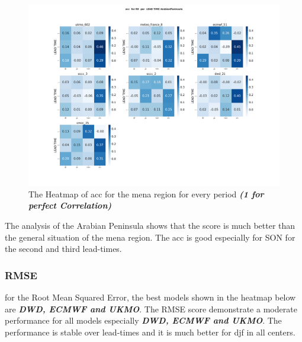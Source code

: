 \begin{figure}[H]
	\centering
	\includegraphics[scale=0.25]{plots/det/acc/acc_RR_ArabianPeninsula.png}
	\caption{The Heatmap of acc for the mena region for every period \textbf{\textit{(1 for perfect Correlation)} }}
\end{figure}

The analysis of the Arabian Peninsula shows that the score is much better than the general situation of the mena region. The acc is good especially for SON for the second and third lead-times.

\subsubsection{RMSE}
 
for the Root Mean Squared Error, the best models shown in the heatmap below are \textbf{\textit{DWD, ECMWF and UKMO}}. The RMSE score demonstrate a moderate performance for all models especially \textbf{\textit{DWD, ECMWF and UKMO}}. The performance is stable over lead-times and it is much better for djf in all centers.

